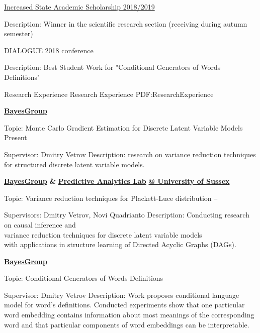 \documentclass[letterpaper,MMMyyyy,nonstopmode]{simpleresumecv}
\begin{document}
\begin{Body}
\BulletItem
\href{https://www.hse.ru/en/scholarships/academic_raised_demo}{Increased State Academic Scholarship 2018/2019}
\begin{Detail}
\Item
Description: Winner in the scientific research section (receiving during autumn semester)
\end{Detail}

\BulletItem
DIALOGUE 2018 conference
\begin{Detail}
\Item
Description: Best Student Work for "Conditional Generators of Words Definitions"
\end{Detail}



\Section
{Research Experience}
{Research Experience}
{PDF:ResearchExperience}

\Entry
\href{https://bayesgroup.ru}
{\textbf{BayesGroup}}

\BulletItem
Topic: Monte Carlo Gradient Estimation for Discrete Latent Variable Models
\hfill
Present
\begin{Detail}
\SubBulletItem
Supervisor:
Dmitry Vetrov
\SubBulletItem
Description: research on variance reduction techniques
\newline
for structured discrete latent variable models.
\end{Detail}

\newpage

\Entry
\href{https://bayesgroup.ru}
{\textbf{BayesGroup}} \textbf{\&} \href{https://wearepal.ai}{\textbf{Predictive Analytics Lab}} \href{http://sussex.ac.uk}{\textbf{@ University of Sussex}}

\BulletItem
Topic: Variance reduction techniques for Plackett-Luce distribution
\hfill
{} --
\begin{Detail}
\SubBulletItem
Supervisors:
Dmitry Vetrov, Novi Quadrianto
\SubBulletItem
Description:
Conducting research on causal inference and\\ variance reduction techniques for discrete latent variable models\\ with applications in structure learning of Directed Acyclic Graphs (DAGs).
\end{Detail}

\Entry
\href{https://bayesgroup.ru}
{\textbf{BayesGroup}}

\Gap
\BulletItem
Topic: Conditional Generators of Words Definitions
\hfill
{} --
\begin{Detail}
\SubBulletItem
Supervisor:
Dmitry Vetrov
\SubBulletItem
Description:
Work proposes conditional language model for word’s definitions. \newline
Conducted experiments show that one particular word embedding contains \newline
information about most meanings of the corresponding word and that \newline
particular components of word embeddings can be interpretable.
\end{Detail}


\end{Body}
\end{document}
